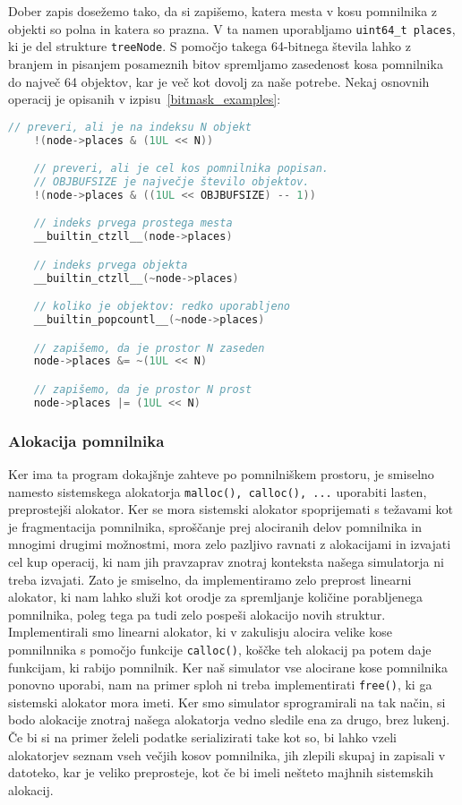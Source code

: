 \documentclass[a4paper,12pt]{article}
\begin{document}
Dober zapis dosežemo tako, da si zapišemo, katera mesta v kosu pomnilnika z objekti
so polna in katera so prazna. V ta namen uporabljamo \lstinline|uint64_t places|, ki je del strukture 
\lstinline|treeNode|. S pomočjo takega 64-bitnega števila lahko z branjem in pisanjem posameznih bitov
spremljamo zasedenost kosa pomnilnika do največ 64 objektov, kar je več kot dovolj za naše potrebe. 
Nekaj osnovnih operacij je opisanih v izpisu~\ref{bitmask_examples}:
\begin{lstlisting}[caption={Uporaba bitne maske za objekte}, label=bitmask_examples, language=C]
    // preveri, ali je na indeksu N objekt
    !(node->places & (1UL << N))

    // preveri, ali je cel kos pomnilnika popisan.
    // OBJBUFSIZE je največje število objektov.
    !(node->places & ((1UL << OBJBUFSIZE) -- 1)) 

    // indeks prvega prostega mesta
    __builtin_ctzll__(node->places)

    // indeks prvega objekta
    __builtin_ctzll__(~node->places)

    // koliko je objektov: redko uporabljeno
    __builtin_popcountl__(~node->places)

    // zapišemo, da je prostor N zaseden
    node->places &= ~(1UL << N)

    // zapišemo, da je prostor N prost
    node->places |= (1UL << N)

\end{lstlisting}
\subsubsection{Alokacija pomnilnika}
Ker ima ta program dokajšnje zahteve po pomnilniškem prostoru, je smiselno namesto sistemskega
alokatorja \lstinline|malloc(), calloc(), ...| uporabiti lasten, preprostejši alokator.
Ker se mora sistemski alokator spoprijemati s težavami kot je fragmentacija pomnilnika, sproščanje
prej alociranih delov pomnilnika in mnogimi drugimi možnostmi, mora zelo pazljivo
ravnati z alokacijami in izvajati cel kup operacij, ki nam jih pravzaprav znotraj konteksta našega simulatorja
ni treba izvajati. Zato je smiselno, da implementiramo zelo preprost linearni alokator, ki nam lahko služi kot orodje
za spremljanje količine porabljenega pomnilnika, poleg tega pa tudi zelo pospeši alokacijo novih struktur.
Implementirali smo linearni alokator, ki v zakulisju alocira velike kose pomnilnnika s pomočjo
funkcije \lstinline|calloc()|, koščke teh alokacij pa potem daje funkcijam, ki rabijo pomnilnik.
Ker naš simulator vse alocirane kose pomnilnika ponovno uporabi, nam na primer sploh ni treba implementirati
\lstinline|free()|, ki ga sistemski alokator mora imeti. Ker smo simulator sprogramirali na tak način,
si bodo alokacije znotraj našega alokatorja vedno sledile ena za drugo, brez lukenj. Če bi si na primer želeli
podatke serializirati take kot so, bi lahko vzeli alokatorjev seznam vseh večjih kosov pomnilnika, jih zlepili
skupaj in zapisali v datoteko, kar je veliko preprosteje, kot če bi imeli nešteto majhnih sistemskih alokacij.
\end{document}
